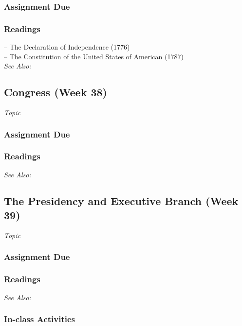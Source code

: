 \documentclass[12pt,a4paper]{article}
\newcommand{\seealso}{\noindent \emph{See Also:}\\}
\begin{document}
\subsubsection*{Assignment Due}

\subsubsection*{Readings}
-- The Declaration of Independence (1776)\\
-- The Constitution of the United States of American (1787)\\

\seealso




\clearpage
\subsection{Congress (Week 38)}
\emph{Topic}
\vspace{1em}
\subsubsection*{Assignment Due}

\subsubsection*{Readings}

\seealso



\clearpage
\subsection{The Presidency and Executive Branch (Week 39)}
\emph{Topic}
\vspace{1em}
\subsubsection*{Assignment Due}

\subsubsection*{Readings}

\seealso

\subsubsection*{In-class Activities}
\end{document}
